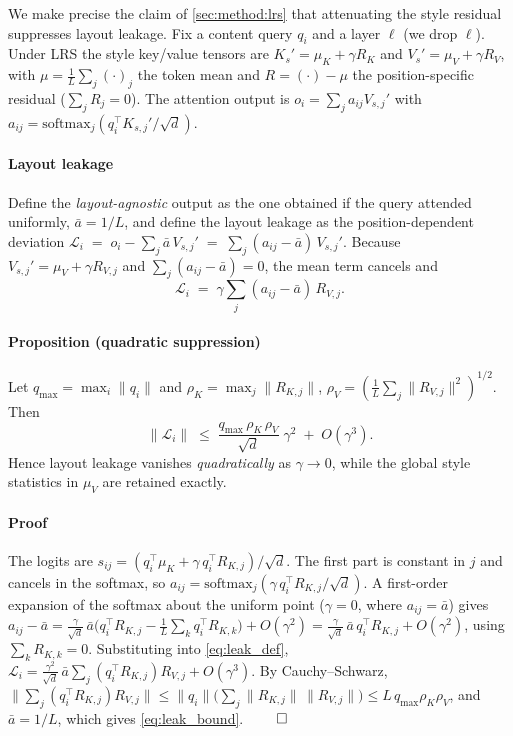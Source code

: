 We make precise the claim of \cref{sec:method:lrs} that attenuating the style
residual suppresses layout leakage. Fix a content query $q_i$ and a layer
$\ell$ (we drop $\ell$). Under LRS the style key/value tensors are
$K_s'=\mu_K+\gamma R_K$ and $V_s'=\mu_V+\gamma R_V$, with
$\mu=\tfrac1L\sum_j(\cdot)_j$ the token mean and $R=(\cdot)-\mu$ the
position-specific residual ($\sum_j R_j=0$). The attention output is
$o_i=\sum_j a_{ij}V_{s,j}'$ with $a_{ij}=\mathrm{softmax}_j(q_i^\top K_{s,j}'/\sqrt d)$.

\paragraph{Layout leakage}
Define the \emph{layout-agnostic} output as the one obtained if the query
attended uniformly, $\bar a=1/L$, and define the layout leakage as the
position-dependent deviation
$\mathcal{L}_i \;=\; o_i-\sum_j \bar a\,V_{s,j}' \;=\; \sum_j (a_{ij}-\bar a)\,V_{s,j}'$.
Because $V_{s,j}'=\mu_V+\gamma R_{V,j}$ and $\sum_j(a_{ij}-\bar a)=0$, the mean
term cancels and
\begin{equation}
  \mathcal{L}_i \;=\; \gamma \sum_j (a_{ij}-\bar a)\,R_{V,j}.
  \label{eq:leak_def}
\end{equation}

\paragraph{Proposition (quadratic suppression)}
Let $q_{\max}=\max_i\|q_i\|$ and $\rho_K=\max_j\|R_{K,j}\|$,
$\rho_V=(\tfrac1L\sum_j\|R_{V,j}\|^2)^{1/2}$. Then
\begin{equation}
  \|\mathcal{L}_i\| \;\le\; \frac{q_{\max}\,\rho_K\,\rho_V}{\sqrt d}\;\gamma^2
  \;+\; O(\gamma^3).
  \label{eq:leak_bound}
\end{equation}
Hence layout leakage vanishes \emph{quadratically} as $\gamma\to0$, while the
global style statistics in $\mu_V$ are retained exactly.

\paragraph{Proof}
The logits are $s_{ij}=(q_i^\top\mu_K+\gamma\,q_i^\top R_{K,j})/\sqrt d$. The
first part is constant in $j$ and cancels in the softmax, so
$a_{ij}=\mathrm{softmax}_j(\gamma\,q_i^\top R_{K,j}/\sqrt d)$. A first-order
expansion of the softmax about the uniform point ($\gamma{=}0$, where
$a_{ij}=\bar a$) gives
$a_{ij}-\bar a=\frac{\gamma}{\sqrt d}\,\bar a\big(q_i^\top R_{K,j}-\textstyle\frac1L\sum_k q_i^\top R_{K,k}\big)+O(\gamma^2)
=\frac{\gamma}{\sqrt d}\,\bar a\,q_i^\top R_{K,j}+O(\gamma^2)$,
using $\sum_k R_{K,k}=0$. Substituting into \cref{eq:leak_def},
$\mathcal{L}_i=\frac{\gamma^2}{\sqrt d}\,\bar a\sum_j (q_i^\top R_{K,j})R_{V,j}+O(\gamma^3)$.
By Cauchy--Schwarz, $\|\sum_j(q_i^\top R_{K,j})R_{V,j}\|\le \|q_i\|\big(\sum_j\|R_{K,j}\|\,\|R_{V,j}\|\big)\le L\,q_{\max}\rho_K\rho_V$, and $\bar a=1/L$, which gives \cref{eq:leak_bound}. $\qed$

